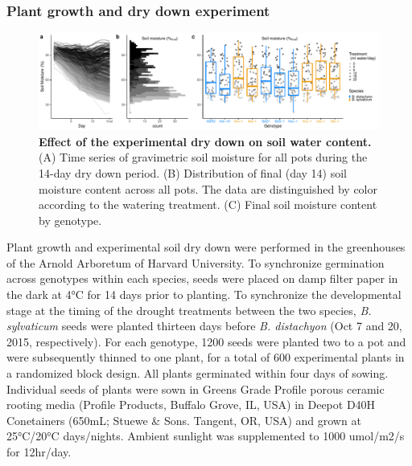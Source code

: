 \documentclass[jou,floatsintext]{apa6}
\begin{document}
\hypertarget{plant-growth-and-dry-down-experiment}{%
\subsubsection{Plant growth and dry down experiment}\label{plant-growth-and-dry-down-experiment}}



\begin{figure}[!h]
\includegraphics[width=\textwidth]{../Figures/DryDown_lines} \caption{\textbf{Effect of the experimental dry down on soil water content.} (A) Time series of gravimetric soil moisture for all pots during the 14-day dry down period. (B) Distribution of final (day 14) soil moisture content across all pots. The data are distinguished by color according to the watering treatment. (C) Final soil moisture content by genotype.}\label{fig:drydown}
\end{figure}

Plant growth and experimental soil dry down were performed in the greenhouses of the Arnold Arboretum of Harvard University. To synchronize germination across genotypes within each species, seeds were placed on damp filter paper in the dark at 4°C for 14 days prior to planting. To synchronize the developmental stage at the timing of the drought treatments between the two species, \emph{B. sylvaticum} seeds were planted thirteen days before \emph{B. distachyon} (Oct 7 and 20, 2015, respectively). For each genotype, 1200 seeds were planted two to a pot and were subsequently thinned to one plant, for a total of 600 experimental plants in a randomized block design. All plants germinated within four days of sowing. Individual seeds of plants were sown in Greens Grade Profile porous ceramic rooting media (Profile Products, Buffalo Grove, IL, USA) in Deepot D40H Conetainers (650mL; Stuewe \& Sons. Tangent, OR, USA) and grown at 25°C/20°C days/nights. Ambient sunlight was supplemented to 1000 umol/m2/s for 12hr/day.
\end{document}

